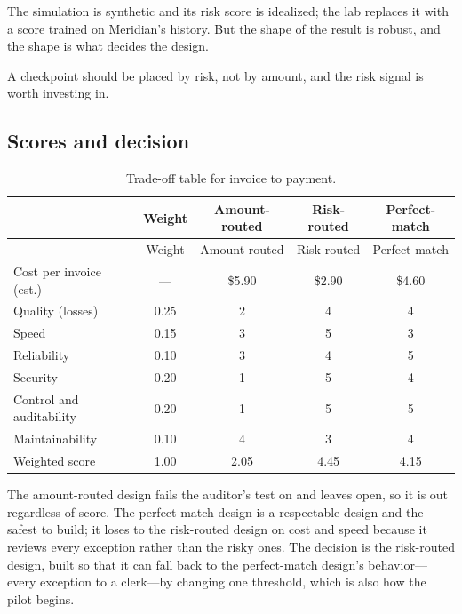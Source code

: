 The simulation is synthetic and its risk score is idealized; the lab replaces it with a score trained on Meridian's history. But the shape of the result is robust, and the shape is what decides the design.

\begin{keyidea}
A checkpoint should be placed by risk, not by amount, and the risk signal is worth investing in.
\end{keyidea}

\subsection{Scores and decision}

\begingroup
\small
\begin{longtable}{@{}lcccc@{}}
\caption{Trade-off table for invoice to payment.}\label{tab:inv-tradeoff}\\
\toprule
\rowcolor{coHead} & Weight & Amount-routed & Risk-routed & Perfect-match \\
\midrule
\endfirsthead
\toprule
\rowcolor{coHead} & Weight & Amount-routed & Risk-routed & Perfect-match \\
\midrule
\endhead
Cost per invoice (est.) & --- & \$5.90 & \$2.90 & \$4.60 \\
\midrule
Quality (losses) & 0.25 & 2 & 4 & 4 \\
Speed & 0.15 & 3 & 5 & 3 \\
Reliability & 0.10 & 3 & 4 & 5 \\
Security & 0.20 & 1 & 5 & 4 \\
Control and auditability & 0.20 & 1 & 5 & 5 \\
Maintainability & 0.10 & 4 & 3 & 4 \\
\midrule
\rowcolor{coAmberBg} Weighted score & 1.00 & 2.05 & 4.45 & 4.15 \\
\bottomrule
\end{longtable}
\endgroup

The amount-routed design fails the auditor's test on  and leaves  open, so it is out regardless of score. The perfect-match design is a respectable design and the safest to build; it loses to the risk-routed design on cost and speed because it reviews every exception rather than the risky ones. The decision is the risk-routed design, built so that it can fall back to the perfect-match design's behavior---every exception to a clerk---by changing one threshold, which is also how the pilot begins.
